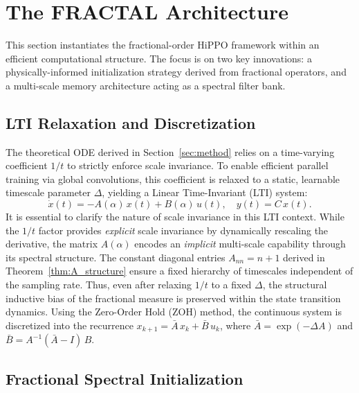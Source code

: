 \documentclass{article}
\theoremstyle{plain}
\theoremstyle{definition}
\theoremstyle{remark}
\begin{document}
\section{The FRACTAL Architecture}
\label{sec:model}

This section instantiates the fractional-order HiPPO framework within an efficient computational structure.
The focus is on two key innovations: a physically-informed initialization strategy derived from fractional operators, and a multi-scale memory architecture acting as a spectral filter bank. 

\subsection{LTI Relaxation and Discretization}
\label{subsec:discretization}

The theoretical ODE derived in Section~\ref{sec:method} relies on a time-varying coefficient $1/t$ to strictly enforce scale invariance.
To enable efficient parallel training via global convolutions, this coefficient is relaxed to a static, learnable timescale parameter $\Delta$, yielding a Linear Time-Invariant (LTI) system:
\begin{equation}
	\dot{x}(t) = -A(\alpha)\, x(t) + B(\alpha)\, u(t), \quad y(t) = C\, x(t).
	\label{eq:lti_system}
\end{equation}
It is essential to clarify the nature of scale invariance in this LTI context. While the $1/t$ factor provides \textit{explicit} scale invariance by dynamically rescaling the derivative, the matrix $A(\alpha)$ encodes an \textit{implicit} multi-scale capability through its spectral structure. The constant diagonal entries $A_{nn} = n+1$ derived in Theorem~\ref{thm:A_structure} ensure a fixed hierarchy of timescales independent of the sampling rate. Thus, even after relaxing $1/t$ to a fixed $\Delta$, the structural inductive bias of the fractional measure is preserved within the state transition dynamics.
Using the Zero-Order Hold (ZOH) method, the continuous system is discretized into the recurrence $x_{k+1} = \bar{A}\, x_k + \bar{B}\, u_k$, where $\bar{A} = \exp(-\Delta A)$ and $\bar{B} = A^{-1}(\bar{A} - I)\, B$.

\subsection{Fractional Spectral Initialization}
\label{subsec:initialization}
\end{document}
